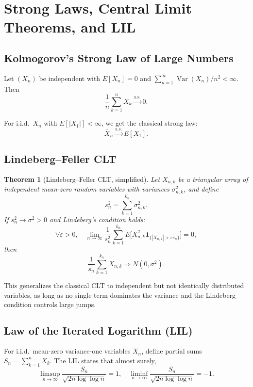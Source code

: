 \documentclass[11pt,a4paper]{article}
\newtheorem{theorem}{Theorem}[section]
\numberwithin{equation}{section}
\begin{document}
\newpage

\section{Strong Laws, Central Limit Theorems, and LIL}

\subsection{Kolmogorov's Strong Law of Large Numbers}

Let $(X_n)$ be independent with $E[X_n]=0$ and $\sum_{n=1}^\infty \operatorname{Var}(X_n)/n^2 < \infty$. 
Then
\[
\frac{1}{n}\sum_{k=1}^n X_k \xrightarrow{\text{a.s.}} 0.
\]

For i.i.d.\ $X_n$ with $E[|X_1|]<\infty$, we get the classical strong law:
\[
\bar{X}_n \xrightarrow{\text{a.s.}} E[X_1].
\]

\subsection{Lindeberg--Feller CLT}

\begin{theorem}[Lindeberg--Feller CLT, simplified]
Let $X_{n,k}$ be a triangular array of independent mean-zero random variables with variances $\sigma_{n,k}^2$, and define
\[
s_n^2 = \sum_{k=1}^{k_n} \sigma_{n,k}^2.
\]
If $s_n^2 \to \sigma^2 > 0$ and Lindeberg's condition holds:
\[
\forall \varepsilon>0,\quad 
\lim_{n\to\infty} \frac{1}{s_n^2}\sum_{k=1}^{k_n} E\big[
X_{n,k}^2 \mathbf{1}_{\{|X_{n,k}|>\varepsilon s_n\}}
\big] = 0,
\]
then
\[
\frac{1}{s_n}\sum_{k=1}^{k_n} X_{n,k} \Rightarrow N(0,\sigma^2).
\]
\end{theorem}

This generalizes the classical CLT to independent but not identically distributed variables, as long as no single term dominates the variance and the Lindeberg condition controls large jumps.

\subsection{Law of the Iterated Logarithm (LIL)}

For i.i.d.\ mean-zero variance-one variables $X_n$, define partial sums $S_n = \sum_{k=1}^n X_k$. 
The LIL states that almost surely,
\[
\limsup_{n\to\infty} \frac{S_n}{\sqrt{2n\log\log n}} = 1,\quad
\liminf_{n\to\infty} \frac{S_n}{\sqrt{2n\log\log n}} = -1.
\]
\end{document}

